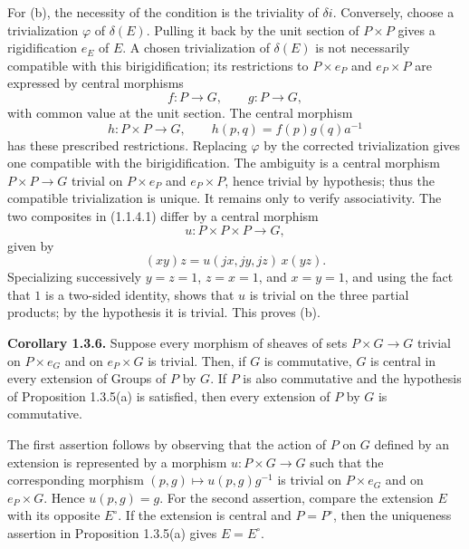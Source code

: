 \documentclass[11pt]{article}
\begin{document}
For (b), the necessity of the condition is the triviality of \(\delta i\).  Conversely, choose a trivialization \(\varphi\) of \(\delta(E)\).  Pulling it back by the unit section of \(P\times P\) gives a rigidification \(e_E\) of \(E\).  A chosen trivialization of \(\delta(E)\) is not necessarily compatible with this birigidification; its restrictions to \(P\times e_P\) and \(e_P\times P\) are expressed by central morphisms
\[
  f:P\to G,\qquad g:P\to G,
\]
with common value at the unit section.  The central morphism
\[
  h:P\times P\to G,\qquad h(p,q)=f(p)g(q)a^{-1}
\]
has these prescribed restrictions.  Replacing \(\varphi\) by the corrected trivialization gives one compatible with the birigidification.  The ambiguity is a central morphism \(P\times P\to G\) trivial on \(P\times e_P\) and \(e_P\times P\), hence trivial by hypothesis; thus the compatible trivialization is unique.  It remains only to verify associativity.  The two composites in (1.1.4.1) differ by a central morphism
\[
  u:P\times P\times P\to G,
\]
given by
\[
  (xy)z=u(jx,jy,jz)\,x(yz).
\]
Specializing successively \(y=z=1\), \(z=x=1\), and \(x=y=1\), and using the fact that \(1\) is a two-sided identity, shows that \(u\) is trivial on the three partial products; by the hypothesis it is trivial.  This proves (b).

\textbf{Corollary 1.3.6.}  Suppose every morphism of sheaves of sets \(P\times G\to G\) trivial on \(P\times e_G\) and on \(e_P\times G\) is trivial.  Then, if \(G\) is commutative, \(G\) is central in every extension of Groups of \(P\) by \(G\).  If \(P\) is also commutative and the hypothesis of Proposition 1.3.5(a) is satisfied, then every extension of \(P\) by \(G\) is commutative.

The first assertion follows by observing that the action of \(P\) on \(G\) defined by an extension is represented by a morphism \(u:P\times G\to G\) such that the corresponding morphism \((p,g)\mapsto u(p,g)g^{-1}\) is trivial on \(P\times e_G\) and on \(e_P\times G\).  Hence \(u(p,g)=g\).  For the second assertion, compare the extension \(E\) with its opposite \(E^\circ\).  If the extension is central and \(P=P^\circ\), then the uniqueness assertion in Proposition 1.3.5(a) gives \(E=E^\circ\).
\end{document}
